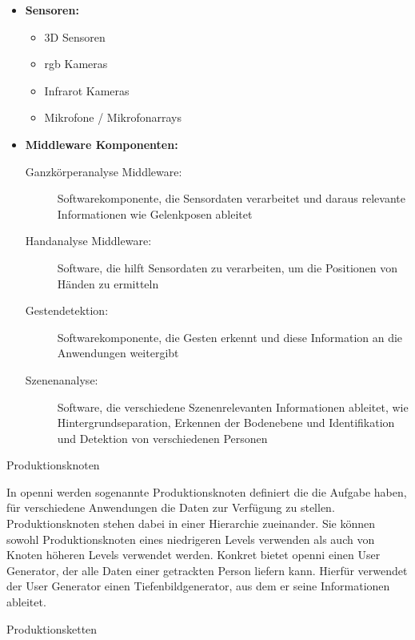 \begin{itemize}
\item \textbf{Sensoren:}
\begin{itemize}
  \item 3D Sensoren
  \item \gls{rgb} Kameras
  \item Infrarot Kameras
  \item Mikrofone / Mikrofonarrays
\end{itemize}
\item \textbf{Middleware Komponenten:}
\begin{description}
  \item[Ganzkörperanalyse Middleware:] Softwarekomponente, die Sensordaten
  verarbeitet und daraus relevante Informationen wie Gelenkposen ableitet
  \item[Handanalyse Middleware:] Software, die hilft Sensordaten zu verarbeiten,
  um die Positionen von Händen zu ermitteln
  \item[Gestendetektion:] Softwarekomponente, die Gesten erkennt und diese
  Information an die Anwendungen weitergibt
  \item[Szenenanalyse:] Software, die verschiedene Szenenrelevanten
  Informationen ableitet, wie Hintergrundseparation, Erkennen der Bodenebene und Identifikation und Detektion von verschiedenen Personen
\end{description}
\end{itemize}


\begin{description}
\item[Produktionsknoten]
\end{description}


In \gls{openni} werden sogenannte Produktionsknoten definiert die die Aufgabe haben,
 für verschiedene Anwendungen die Daten zur Verfügung zu stellen.
 Produktionsknoten stehen dabei in einer Hierarchie zueinander.
 Sie können sowohl Produktionsknoten eines niedrigeren Levels verwenden als auch von Knoten höheren
 Levels verwendet werden. Konkret bietet \gls{openni} einen User Generator, der alle Daten einer getrackten Person
 liefern kann. Hierfür verwendet der User Generator einen Tiefenbildgenerator, aus dem er seine Informationen ableitet.

\begin{description}
\item[Produktionsketten]
\end{description}


